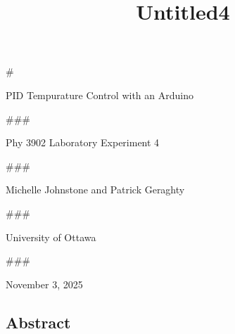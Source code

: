 \documentclass[11pt]{article}
\title{Untitled4}
\begin{document}
    
    \maketitle
    
    

    
    \#

PID Tempurature Control with an Arduino

    

    

    

    

    

    

    

    

    

    

    

    

    

    \#\#\#

Phy 3902 Laboratory Experiment 4

    

    

    

    

    

    

    

    

    

    

    

    

    

    \#\#\#

Michelle Johnstone and Patrick Geraghty

    \#\#\#

University of Ottawa

    \#\#\#

November 3, 2025

    \hypertarget{abstract}{%
\subsection{Abstract}\label{abstract}}
\end{document}
